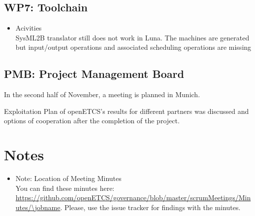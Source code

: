 \documentclass[a4paper, 11pt]{article}
\begin{document}
\subsection{WP7: Toolchain}

\begin{itemize}
\item Acivities\\
SysML2B translator still does not work in Luna. The machines are generated but input/output operations and associated scheduling operations are missing 
\end{itemize}

\subsection{PMB: Project Management Board}

In the second half of November, a meeting is planned in Munich.

Exploitation Plan of openETCS's results for different partners was discussed and options of cooperation after the completion of the project. 

\section{Notes}
\begin{itemize}

\item Note: Location of Meeting Minutes\\
You can find these minutes here: \url{https://github.com/openETCS/governance/blob/master/scrumMeetings/Minutes/\jobname}. Please, use the issue tracker for findings with the minutes.

\end{itemize}
\end{document}
